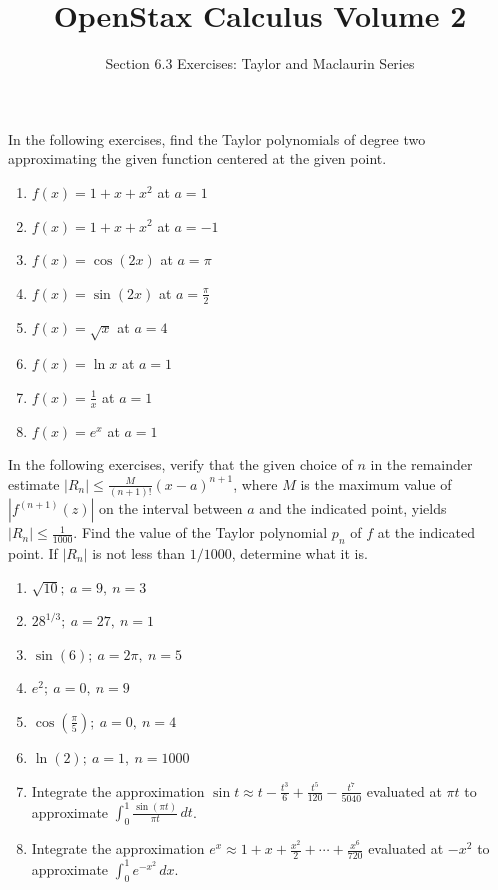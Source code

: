 \documentclass{exercises}
\title{OpenStax Calculus Volume 2}
\subtitle{Section 6.3 Exercises: Taylor and Maclaurin Series}
\author{}
\date{}
\begin{document}
\maketitle


In the following exercises, find the Taylor polynomials of degree two approximating the given function centered at the given point.

\begin{enumerate}[start=1]
\item $f(x)=1+x+x^{2}$ at $a=1$
\item $f(x)=1+x+x^{2}$ at $a=-1$
\item $f(x)=\cos(2x)$ at $a=\pi$
\item $f(x)=\sin(2x)$ at $a=\frac{\pi}{2}$
\item $f(x)=\sqrt{x}$ at $a=4$
\item $f(x)=\ln x$ at $a=1$
\item $f(x)=\frac{1}{x}$ at $a=1$
\item $f(x)=e^{x}$ at $a=1$
\end{enumerate}

In the following exercises, verify that the given choice of $n$ in the remainder estimate $|R_{n}|\le \frac{M}{(n+1)!}(x-a)^{n+1}$, where $M$ is the maximum value of $|f^{(n+1)}(z)|$ on the interval between $a$ and the indicated point, yields $|R_{n}|\le \frac{1}{1000}$. Find the value of the Taylor polynomial $p_{n}$ of $f$ at the indicated point. If $|R_{n}|$ is not less than $1/1000$, determine what it is.

\begin{enumerate}[resume]
\item \techrequired $\sqrt{10};\ a=9,\ n=3$
\item \techrequired $28^{1/3};\ a=27,\ n=1$
\item \techrequired $\sin(6);\ a=2\pi,\ n=5$
\item \techrequired $e^{2};\ a=0,\ n=9$
\item \techrequired $\cos\left(\frac{\pi}{5}\right);\ a=0,\ n=4$
\item \techrequired $\ln(2);\ a=1,\ n=1000$
\item Integrate the approximation $\sin t\approx t-\frac{t^{3}}{6}+\frac{t^{5}}{120}-\frac{t^{7}}{5040}$ evaluated at $\pi t$ to approximate $\int_{0}^{1}\frac{\sin(\pi t)}{\pi t}\,dt$.
\item Integrate the approximation $e^{x}\approx1+x+\frac{x^{2}}{2}+\cdots+\frac{x^{6}}{720}$ evaluated at $-x^{2}$ to approximate $\int_{0}^{1}e^{-x^{2}}\,dx$.
\end{enumerate}
\end{document}

